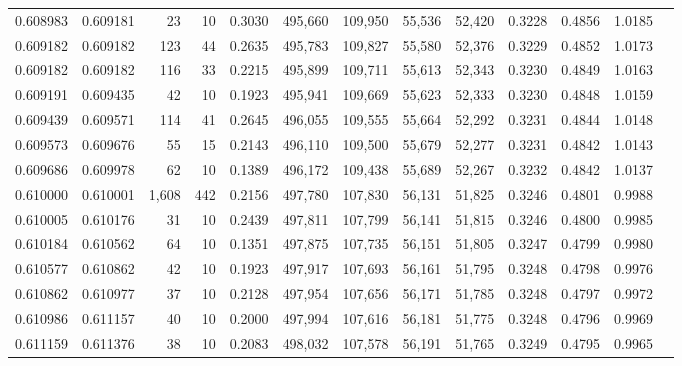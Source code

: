 \begin{tabular}{rrrrrrrrrrrrr}
0.608983 & 0.609181 &    23 &  10 &                                     0.3030 & 495,660 & 109,950 &  55,536 &  52,420 & 0.3228 & 0.4856 & 1.0185 \\
0.609182 & 0.609182 &   123 &  44 &                                     0.2635 & 495,783 & 109,827 &  55,580 &  52,376 & 0.3229 & 0.4852 & 1.0173 \\
0.609182 & 0.609182 &   116 &  33 &                                     0.2215 & 495,899 & 109,711 &  55,613 &  52,343 & 0.3230 & 0.4849 & 1.0163 \\
0.609191 & 0.609435 &    42 &  10 &                                     0.1923 & 495,941 & 109,669 &  55,623 &  52,333 & 0.3230 & 0.4848 & 1.0159 \\
0.609439 & 0.609571 &   114 &  41 &                                     0.2645 & 496,055 & 109,555 &  55,664 &  52,292 & 0.3231 & 0.4844 & 1.0148 \\
0.609573 & 0.609676 &    55 &  15 &                                     0.2143 & 496,110 & 109,500 &  55,679 &  52,277 & 0.3231 & 0.4842 & 1.0143 \\
0.609686 & 0.609978 &    62 &  10 &                                     0.1389 & 496,172 & 109,438 &  55,689 &  52,267 & 0.3232 & 0.4842 & 1.0137 \\
0.610000 & 0.610001 & 1,608 & 442 &                                     0.2156 & 497,780 & 107,830 &  56,131 &  51,825 & 0.3246 & 0.4801 & 0.9988 \\
0.610005 & 0.610176 &    31 &  10 &                                     0.2439 & 497,811 & 107,799 &  56,141 &  51,815 & 0.3246 & 0.4800 & 0.9985 \\
0.610184 & 0.610562 &    64 &  10 &                                     0.1351 & 497,875 & 107,735 &  56,151 &  51,805 & 0.3247 & 0.4799 & 0.9980 \\
0.610577 & 0.610862 &    42 &  10 &                                     0.1923 & 497,917 & 107,693 &  56,161 &  51,795 & 0.3248 & 0.4798 & 0.9976 \\
0.610862 & 0.610977 &    37 &  10 &                                     0.2128 & 497,954 & 107,656 &  56,171 &  51,785 & 0.3248 & 0.4797 & 0.9972 \\
0.610986 & 0.611157 &    40 &  10 &                                     0.2000 & 497,994 & 107,616 &  56,181 &  51,775 & 0.3248 & 0.4796 & 0.9969 \\
0.611159 & 0.611376 &    38 &  10 &                                     0.2083 & 498,032 & 107,578 &  56,191 &  51,765 & 0.3249 & 0.4795 & 0.9965 \\

\end{tabular}

